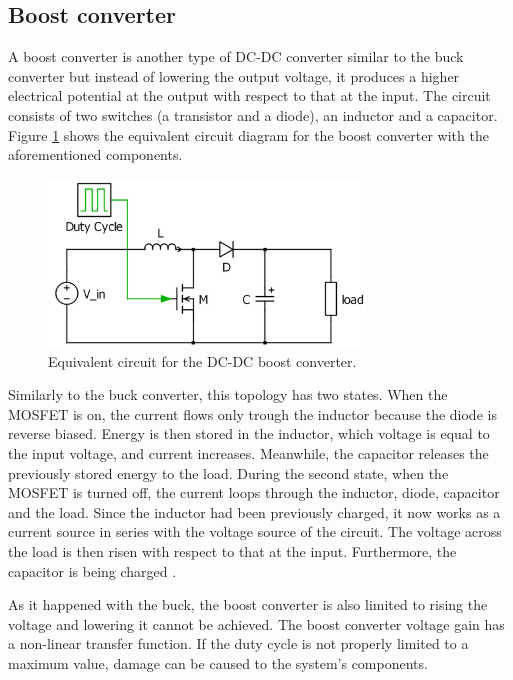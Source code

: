 \subsection{Boost converter\label{Boost-C}}

A boost converter is another type of DC-DC converter similar to the buck converter but instead of lowering the output voltage, it produces a higher electrical potential at the output with respect to that at the input. 
The circuit consists of two switches (a transistor and a diode), an inductor and a capacitor. Figure \ref{Boost-converter} shows the equivalent circuit diagram for the boost converter with the aforementioned components. %

\begin{figure}[H]
	\begin{center}
		\includegraphics[width=0.75\textwidth]{../Pictures/Boost-converter}
		\caption{Equivalent circuit for the DC-DC boost converter.}
		\label{Boost-converter}
	\end{center}	
\end{figure}


Similarly to the buck converter, this topology has two states. When the MOSFET is on, the current flows only trough the inductor because the diode  is reverse biased. Energy is then stored in the inductor, which voltage is equal to the input voltage, and current increases. Meanwhile, the capacitor releases the previously stored energy to the load.
During the second state, when the MOSFET is turned off, the current loops through the inductor, diode, capacitor and the load. Since the inductor had been previously charged, it now works as a current source in series with the voltage source of the circuit. The voltage across the load is then risen with respect to that at the input. Furthermore, the capacitor is being charged \cite{schematicbuckandboost}. 

As it happened with the buck, the boost converter is also limited to rising the voltage and lowering it cannot be achieved. The boost converter voltage gain has a non-linear transfer function.  If the duty cycle is not properly limited to a maximum value, damage can be caused to the system's components. \cite{advantagebuckboost}
 
